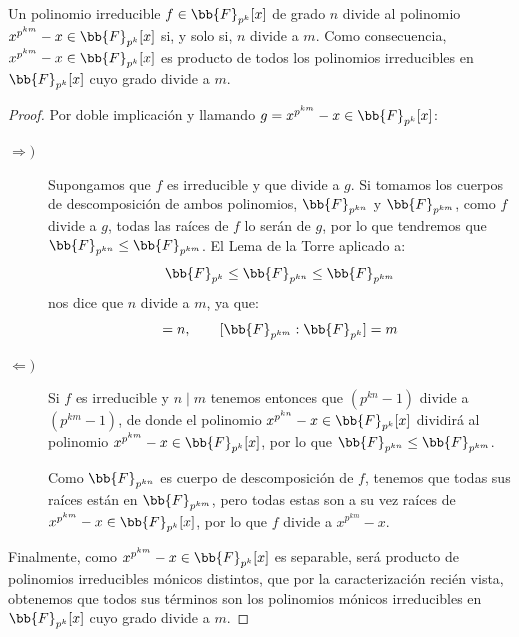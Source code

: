 \begin{teo}
    Un polinomio irreducible $f\in \bb{F}_{p^k}[x]$ de grado $n$ divide al polinomio $x^{p^{km}}-x\in \bb{F}_{p^k}[x]$ si, y solo si, $n$ divide a $m$.\newline
    Como consecuencia, $x^{p^{km}}-x\in \bb{F}_{p^{k}}[x]$ es producto de todos los polinomios irreducibles en $\bb{F}_{p^k}[x]$ cuyo grado divide a $m$.
    \begin{proof}
        Por doble implicación y llamando $g = x^{p^{km}}-x\in \bb{F}_{p^k}[x]$:
        \begin{description}
            \item [$\Longrightarrow )$] Supongamos que $f$ es irreducible y que divide a $g$. Si tomamos los cuerpos de descomposición de ambos polinomios, $\bb{F}_{p^{kn}}$ y $\bb{F}_{p^{km}}$, como $f$ divide a $g$, todas las raíces de $f$ lo serán de $g$, por lo que tendremos que $\bb{F}_{p^{kn}}\leq \bb{F}_{p^{km}}$. El Lema de la Torre aplicado a:
                \begin{equation*}
                    \bb{F}_{p^k} \leq \bb{F}_{p^{kn}} \leq \bb{F}_{p^{km}}
                \end{equation*}
                nos dice que $n$ divide a $m$, ya que:
                \begin{equation*}
                    [\bb{F}_{p^{kn}}:\bb{F}_{p^k}] = n, \qquad [\bb{F}_{p^{km}}:\bb{F}_{p^k}] = m
                \end{equation*}
            \item [$\Longleftarrow )$] Si $f$ es irreducible y $n\mid m$ tenemos entonces que $(p^{kn}-1)$ divide a $(p^{km}-1)$, de donde el polinomio $x^{p^{kn}}-x\in \bb{F}_{p^k}[x]$ dividirá al polinomio $x^{p^{km}}-x\in \bb{F}_{p^k}[x]$, por lo que $\bb{F}_{p^{kn}}\leq \bb{F}_{p^{km}}$.

                Como $\bb{F}_{p^{kn}}$ es cuerpo de descomposición de $f$, tenemos que todas sus raíces están en $\bb{F}_{p^{km}}$, pero todas estas son a su vez raíces de $x^{p^{km}}-x\in \bb{F}_{p^{k}}[x]$, por lo que $f$ divide a $x^{p^{km}}-x$.
        \end{description}
        Finalmente, como $x^{p^{km}}-x\in \bb{F}_{p^k}[x]$ es separable, será producto de polinomios irreducibles mónicos distintos, que por la caracterización recién vista, obtenemos que todos sus términos son los polinomios mónicos irreducibles en $\bb{F}_{p^k}[x]$ cuyo grado divide a $m$.
    \end{proof}
\end{teo}

